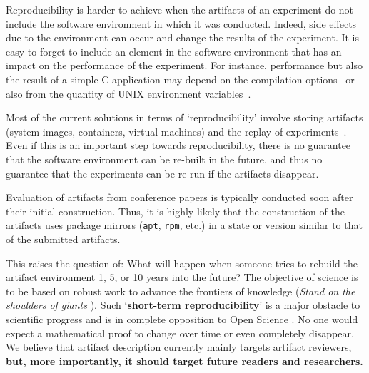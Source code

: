 \documentclass[sigconf,natbib=false]{acmart}
\newcommand{\repro}{reproducibility}
\begin{document}

Reproducibility is harder to achieve when the artifacts of an experiment do not include the software environment in which it was conducted.
Indeed, side effects due to the environment can occur and change the results of the experiment.
It is easy to forget to include an element in the software environment that has an impact on the performance of the experiment.
For instance, performance but also the result of a simple C application may depend on the compilation options\ \cite{stodden2018assessing} or also from the quantity of UNIX environment variables\ \cite{mytkowicz2009producing}.

Most of the current solutions in terms of `\repro' involve storing artifacts (system images, containers, virtual machines) and the replay of experiments\ \cite{rosendo2020e2clab, brammer2011paper, brinckman2019computing}.
Even if this is an important step towards \repro, there is no guarantee that the software environment can be re-built in the future, and thus no guarantee that the experiments can be re-run if the artifacts disappear. 

Evaluation of artifacts from conference papers is typically conducted soon after their initial construction.
Thus, it is highly likely that the construction of the artifacts uses package mirrors (\texttt{apt}, \texttt{rpm}, etc.) in a state or version similar to that of the submitted artifacts.

This raises the question of: What will happen when someone tries to rebuild the artifact environment 1, 5, or 10 years into the future?
The objective of science is to be based on robust work to advance the frontiers of knowledge (\emph{Stand on the shoulders of giants} \cite{giant}).
Such `\textbf{short-term reproducibility}' is a major obstacle to scientific progress and is in complete opposition to Open Science \cite{openscience_unesco}.
No one would expect a mathematical proof to change over time or even completely disappear.
We believe that artifact description currently mainly targets artifact reviewers, \textbf{but, more importantly, it should target future readers and researchers.}
\end{document}
